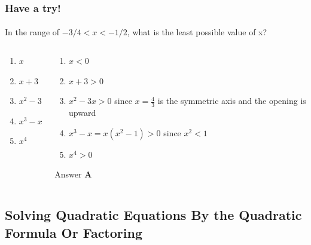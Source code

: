 \documentclass[
	11pt, %
	handout,
]{beamer}
\begin{document}
\begin{frame}
	\frametitle{Have a try!}
	\framesubtitle{}

In the range of $-3/4 < x < -1/2$, what is the least possible value of x?
\bigskip
	\begin{columns}[t] 
		\begin{column}{0.45\textwidth} %
			\begin{enumerate}[A]
				\item $x$
				\item $x + 3$
				\item $x^2 -3x$
				\item $x^3 - x$
				\item $x^4$
			\end{enumerate}
		\end{column}
		\begin{column}{0.5\textwidth} %
		  \pause
			\begin{enumerate}[A]
				\item $x <0$ 
				\item $x + 3 >0$ 
				\item $x^2 -3x>0$ since $x=\frac{4}{3}$ is the symmetric axis and the opening is upward
				\item $x^3 - x= x(x^2 - 1) >0$ since $x^2 <1$
				\item $x^4>0$
			\end{enumerate}
		\bigskip
    Answer \textbf{A}
    \end{column}
	\end{columns}
\end{frame}


\subsection{Solving Quadratic Equations By the Quadratic Formula Or Factoring}

\end{document}
